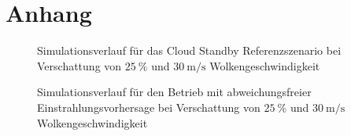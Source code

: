 \appendix
\chapter{Anhang}\label{ch_anhang}
\begin{figure}[h!]
    \centering
    \setlength{\fboxsep}{1pt}
    \setlength{\fboxrule}{1pt}
    \caption[Simulationsverlauf für das Cloud Standby Referenzszenario bei Verschattung von $\SI{25}{\percent}$ und $\SI{30}{\metre\per\second}$ Wolkengeschwindigkeit]{Simulationsverlauf für das Cloud Standby Referenzszenario bei Verschattung von $\SI{25}{\percent}$ und $\SI{30}{\metre\per\second}$ Wolkengeschwindigkeit}
    \label{fig_nocontrol7530}
\end{figure}

\begin{figure}[h!]
    \centering
    \setlength{\fboxsep}{1pt}
    \setlength{\fboxrule}{1pt}
    \caption[Simulationsverlauf für den Betrieb mit abweichungsfreier Einstrahlungsvorhersage bei Verschattung von $\SI{25}{\percent}$ und $\SI{30}{\metre\per\second}$ Wolkengeschwindigkeit]{Simulationsverlauf für den Betrieb mit abweichungsfreier Einstrahlungsvorhersage bei Verschattung von $\SI{25}{\percent}$ und $\SI{30}{\metre\per\second}$ Wolkengeschwindigkeit}
    \label{fig_allwissend7530}
\end{figure}


